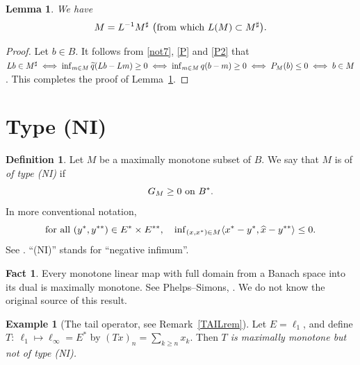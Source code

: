 \documentclass[letterpaper]{article}
\theoremstyle{plain}
\newtheorem{lemma}[theorem]{Lemma}
\theoremstyle{definition}
\newtheorem{definition}[theorem]{Definition}
\newtheorem{example}[theorem]{Example}
\newtheorem{fact}[theorem]{Fact}
\numberwithin{equation}{section}
\newcommand{\all}{\hbox{for all}}
\newcommand{\bra}[2]{\langle#1,#2\rangle}
\newcommand{\dbs}{^{**}}
\newcommand{\infn}{\inf\nolimits}
\newcommand{\on}{\hbox{on}}
\newcommand{\qt}{\wt q}
\newcommand{\wh}{\widehat}
\newcommand{\wt}{\widetilde}
\newcommand{\Def}{Definition~\ref}
\newcommand{\Ex}{Example~\ref}
\newcommand{\Lem}{Lemma~\ref}
\newcommand{\Rem}{Remark~\ref}
\newcommand{\Sec}{Section~\ref}
\begin{document}
\begin{lemma}\label{LMMFlem}
We have
\begin{equation}\label{AFMAX1}
M = L^{-1}M^\sharp\ \big(\hbox{from which }L(M) \subset M^\sharp\big).
\end{equation}
\end{lemma}
%
\begin{proof}
Let $b \in B$.   It follows from \eqref{not7}, \eqref{P} and \eqref{P2} that $Lb \in M^\sharp \iff \inf_{m \in M}\qt(Lb - Lm) \ge 0 \iff \inf_{m \in M} q(b - m) \ge 0 \iff P_M(b) \le 0 \iff\break b \in M$.  This completes the proof of \Lem{LMMFlem}. 
\end{proof}



\section{Type (NI)}\label{NIsec}
%
\begin{definition}\label{NIdef}
Let $M$ be a maximally monotone subset of $B$.   We say that $M$ is of {\em of type (NI)} if
\begin{equation}\label{NIdef2}
G_M \ge 0\ \on\ B^*.
\end{equation}
%
In more conventional notation, 
\begin{equation}\label{NIdef1}
\all\ (y^*,y\dbs) \in E^* \times E\dbs,\quad\infn_{(x,x^*) \in M}\bra{x^* - y^*}{\wh x - y\dbs} \le 0.
\end{equation} 
%
See \cite[Definition 10, p.\ 183]{RANGE}. ``(NI)'' stands for ``negative infimum''.
\end{definition}
\begin{fact}\label{FOLKLORE}
Every monotone linear map with full domain from a Banach space into its dual is maximally monotone.   See Phelps--Simons, \cite[Corollary 2.6, p.\ 306]{PS}.   We do not know the original source of this result.
\end{fact}
\begin{example}[The tail operator, see \Rem{TAILrem}]\label{TAILNIex}
Let $E = \ell_1$, and define $T\colon\ \ell_1 \mapsto \ell_\infty = E^*$ by $(Tx)_n = \sum_{k \ge n} x_k$.   Then {\em $T$ is maximally monotone but not of type (NI).}    
%

\end{example}
%
\end{document}
